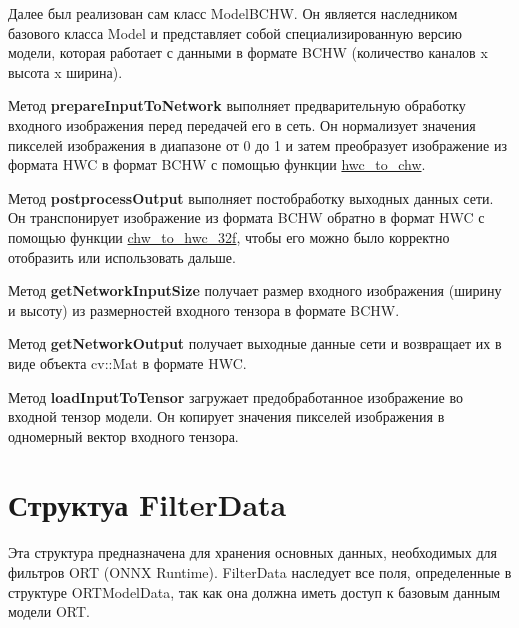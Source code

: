 \documentclass[a4paper,14pt]{extreport}
\begin{document}
        Далее был реализован сам класс ModelBCHW. Он является наследником базового класса Model и представляет собой специализированную версию модели, которая работает с данными в формате BCHW (количество каналов x высота x ширина).
        

        Метод \textbf{prepareInputToNetwork} выполняет предварительную обработку входного изображения перед передачей его в сеть. Он нормализует значения пикселей изображения в диапазоне от 0 до 1 и затем преобразует изображение из формата HWC в формат BCHW с помощью функции \hyperlink{hwc_to_chw}{hwc\_to\_chw}.

        Метод \textbf{postprocessOutput} выполняет постобработку выходных данных сети. Он транспонирует изображение из формата BCHW обратно в формат HWC с помощью функции \hyperlink{chw_to_hwc_32f}{chw\_to\_hwc\_32f}, чтобы его можно было корректно отобразить или использовать дальше.

        Метод \textbf{getNetworkInputSize} получает размер входного изображения (ширину и высоту) из размерностей входного тензора в формате BCHW.
        
        Метод \textbf{getNetworkOutput} получает выходные данные сети и возвращает их в виде объекта cv::Mat в формате HWC.
        
        Метод \textbf{loadInputToTensor} загружает предобработанное изображение во входной тензор модели. Он копирует значения пикселей изображения в одномерный вектор входного тензора.
        
        \section{Структуа FilterData}
        Эта структура предназначена для хранения основных данных, необходимых для фильтров ORT (ONNX Runtime). FilterData наследует все поля, определенные в структуре ORTModelData, так как она должна иметь доступ к базовым данным модели ORT. 
        
\end{document}
